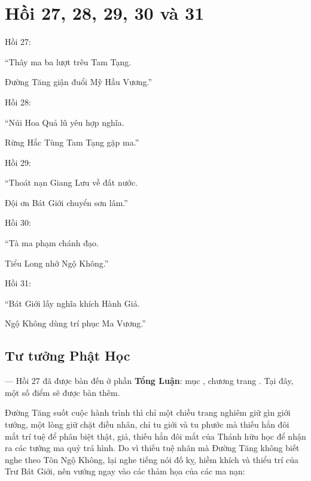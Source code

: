 \chapter{Hồi 27, 28, 29, 30 và 31} %
\label{cha:hoi_27_28}

Hồi 27:

\begin{itshape}
``Thây ma ba lượt trêu Tam Tạng.

Đường Tăng giận đuổi Mỹ Hầu Vương.''
\end{itshape}

Hồi 28:

\begin{itshape}
``Núi Hoa Quả lũ yêu hợp nghĩa.

Rừng Hắc Tùng Tam Tạng gặp ma.''
\end{itshape}

Hồi 29:

\begin{itshape}
``Thoát nạn Giang Lưu về đất nước.

Đội ơn Bát Giới chuyển sơn lâm.''
\end{itshape}

Hồi 30:

\begin{itshape}
``Tà ma phạm chánh đạo.

Tiểu Long nhớ Ngộ Không.''
\end{itshape}

Hồi 31:

\begin{itshape}
``Bát Giới lấy nghĩa khích Hành Giả.

Ngộ Không dùng trí phục Ma Vương.''
\end{itshape}

\section{Tư tưởng Phật Học} %
\label{sec:27_28_phat_hoc}

— Hồi 27 đã được bàn đến ở phần {\bf Tổng Luận}: mục , chương  trang \pageref{sec:bieu_tuong_cua_hoi_thu_26}. Tại đây, một số điểm sẽ được bàn thêm.

Đường Tăng suốt cuộc hành trình thì chỉ một chiều trang nghiêm giữ gìn giới tướng, một lòng giữ chặt điều nhân, chỉ tu giới và tu phước mà thiếu hẳn đôi mắt trí tuệ để phân biệt thật, giả, thiếu hẳn đôi mắt của Thánh hữu học để nhận ra các tướng ma quỷ trá hình. Do vì thiếu tuệ nhãn mà Đường Tăng không biết nghe theo Tôn Ngộ Không, lại nghe tiếng nói đố kỵ, hiềm khích và thiểu trí của Trư Bát Giới, nên vướng ngay vào các thảm họa của các ma nạn:

